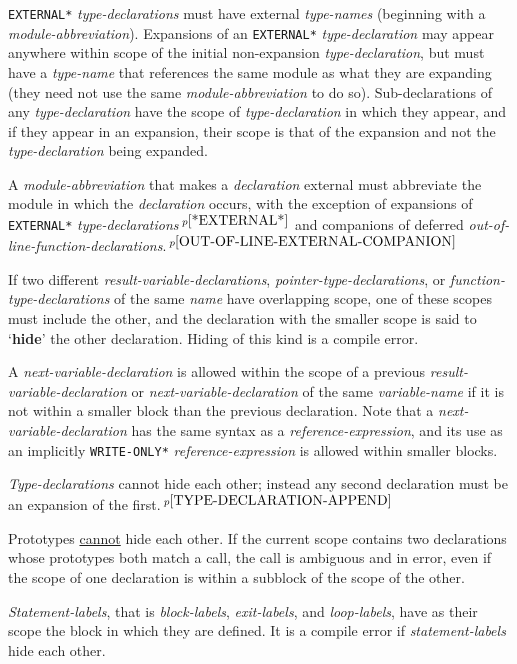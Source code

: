 \documentclass[12pt]{article}
\newcommand{\key}[1]{{\rm \bfseries #1}}
\newcommand{\pagnote}[1]{$\,^{p\pageref{#1}}$}
\begin{document}
{\tt *EXTERNAL*} {\em type-declarations} must have external {\em type-names}
(beginning with a {\em module-abbreviation}).
Expansions of an {\tt *EXTERNAL*} {\em type-declaration} may appear
anywhere within scope of the initial non-expansion {\em type-declaration},
but must have a {\em type-name} that references the same module
as what they are expanding (they need not use the same
{\em module-abbreviation} to do so).
Sub-declarations of any {\em type-declaration} have the scope of
{\em type-declaration} in which they appear, and if they appear in
an expansion, their scope is that of the expansion and not
the {\em type-declaration} being expanded.  

A {\em module-abbreviation} that makes a {\em declaration} external
must abbreviate the module in which the {\em declaration} occurs,
with the exception of expansions of
{\tt *EXTERNAL*} {\em type-declar\-ations}\pagnote{*EXTERNAL*}
and companions of deferred
{\em out-of-line-function-declarations}.\pagnote{OUT-OF-LINE-EXTERNAL-COMPANION}

If two different {\em result-variable-declarations},
{\em pointer-type-declarations}, or {\em function-type-de\-clar\-a\-tions}
of the same {\em name} have overlapping
scope, one of these scopes must include the other,
and the declaration with the smaller scope is said to 
`\key{hide}'\label{HIDE} the other declaration.
Hiding of this kind is a compile error.

A {\em next-variable-declaration} is allowed
within the scope of a previous {\em result-variable-de\-clar\-a\-tion}
or {\em next-variable-declaration} of the same {\em variable-name}
if it is not within a smaller block than the previous declaration.
Note that a {\em next-variable-declaration} has
the same syntax as a {\em reference-expression}, and its use
as an implicitly {\tt *WRITE-ONLY*} {\em reference-expression}
is allowed within smaller blocks.

{\em Type-declarations} cannot hide each other; instead any second
declaration must be an expansion of
the first.\pagnote{TYPE-DECLARATION-APPEND}

Prototypes \underline{cannot} hide each other.  If the
current scope contains two declarations whose prototypes
both match a call, the call is ambiguous and in error,
even if the scope of one declaration is within
a subblock of the scope of the other.

{\em Statement-labels}, that is {\em block-labels},
{\em exit-labels}, and {\em loop-labels}, have as their scope
the block in which they are defined.  It is a compile
error if {\em statement-labels} hide each other.
\end{document}
